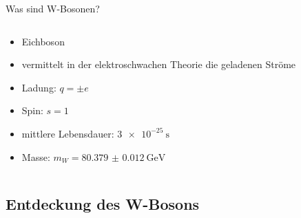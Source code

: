 \documentclass[aspectratio=1610, 9pt]{beamer}
\begin{document}
\begin{frame}{Was sind W-Bosonen?}
\begin{columns}
\begin{column}{0.4\textwidth}
      \begin{itemize}
        \item Eichboson
        \item vermittelt in der elektroschwachen Theorie die geladenen Ströme
        \item Ladung: $q = \pm e$
        \item Spin: $s = 1$
        \item mittlere Lebensdauer: $\SI{3e-25}{\s}$
        \item Masse: $m_W = \SI{80.379(12)}{\GeV}$
      \end{itemize}
    \end{column}
  \end{columns}
\end{frame}

\subsection{Entdeckung des W-Bosons}
\end{document}
